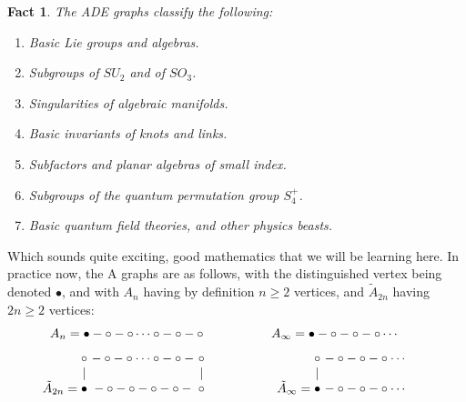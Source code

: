 \documentclass[12pt]{amsbook}
\newtheorem{fact}[theorem]{Fact}
\begin{document}
\begin{fact}
The ADE graphs classify the following:
\begin{enumerate}
\item Basic Lie groups and algebras.

\item Subgroups of $SU_2$ and of $SO_3$.

\item Singularities of algebraic manifolds.

\item Basic invariants of knots and links.

\item Subfactors and planar algebras of small index.

\item Subgroups of the quantum permutation group $S_4^+$.

\item Basic quantum field theories, and other physics beasts.
\end{enumerate}
\end{fact}

Which sounds quite exciting, good mathematics that we will be learning here. In practice now, the A graphs are as follows, with the distinguished vertex being denoted $\bullet$, and with $A_n$ having by definition $n\geq2$ vertices, and $\tilde{A}_{2n}$ having $2n\geq2$ vertices:
$$A_n=\bullet-\circ-\circ\cdots\circ-\circ-\circ\hskip18mm 
A_{\infty}=\bullet-\circ-\circ-\circ\cdots\hskip7mm$$
\vskip-3mm
$$\ \ \ \ \ \ \ \tilde{A}_{2n}=
\begin{matrix}
\circ&\!\!\!\!-\circ-\circ\cdots\circ-\circ-&\!\!\!\!\circ\\
|&&\!\!\!\!|\\
\bullet&\!\!\!\!-\circ-\circ-\circ-\circ-&\!\!\!\!\circ\\
\\
\\
\end{matrix}\hskip20mm 
\tilde{A}_\infty=
\begin{matrix}
\circ&\!\!\!\!-\circ-\circ-\circ\cdots\\
|&\\
\bullet&\!\!\!\!-\circ-\circ-\circ\cdots\\
\\
\\
\end{matrix}
\hskip15mm$$
\vskip-7mm
\end{document}
